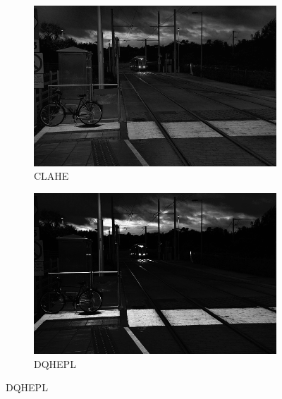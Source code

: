 \documentclass[sigchi]{acmart}
\begin{document}
\begin{figure}[htbp]
	\begin{subfigure}[b]{0.32\textwidth}
		\centering
		\includegraphics[width=\linewidth]{./procesadas/2015_00026/2015_00026_clahe.png}
		\caption{CLAHE}
	\end{subfigure}
	\hfill
	\begin{subfigure}[b]{0.32\textwidth}
		\centering
		\includegraphics[width=\linewidth]{./procesadas/2015_00026/2015_00026_dqhepl.png}
		\caption{DQHEPL}
	\end{subfigure}


\end{figure}
\end{document}
